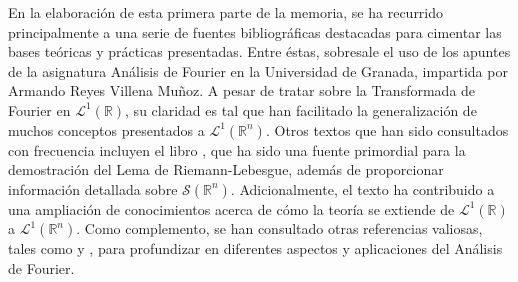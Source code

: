 \vspace{0.2cm}

\noindent En la elaboración de esta primera parte de la memoria, se ha recurrido principalmente a una serie de fuentes bibliográficas destacadas para cimentar las bases teóricas y prácticas presentadas. Entre éstas, sobresale el uso de los apuntes de la asignatura Análisis de Fourier en la Universidad de Granada, impartida por Armando Reyes Villena Muñoz. A pesar de tratar sobre la Transformada de Fourier en $\mathscr{L}^1(\mathbb{R})$, su claridad es tal que han facilitado la generalización de muchos conceptos presentados a $\mathscr{L}^1(\mathbb{R}^n)$.  Otros textos que han sido consultados con frecuencia incluyen el libro \cite{LibroSchwartz}, que ha sido una fuente primordial para la demostración del Lema de Riemann-Lebesgue, además de proporcionar información detallada sobre $\mathscr{S}(\mathbb{R}^n)$.
Adicionalmente, el texto  \cite{FourierTransformsClassic} ha contribuido a una ampliación de conocimientos acerca de cómo la teoría se extiende de $\mathscr{L}^{1}(\mathbb{R})$ a $\mathscr{L}^{1}(\mathbb{R}^n)$. Como complemento, se han consultado otras referencias valiosas, tales como \cite{FirstCourseFourier} y \cite{FourierAnalysisApplications}, para profundizar en diferentes aspectos y aplicaciones del Análisis de Fourier.